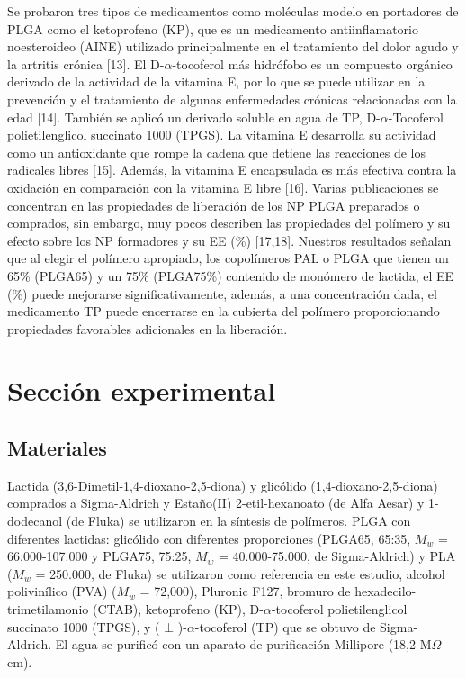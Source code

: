 \documentclass[10pt,letterpaper]{article}
\begin{document}
\begin{multicols}{2}
	Se        probaron   tres tipos de medicamentos como moléculas modelo en portadores de PLGA  como  el ketoprofeno  (KP),  que  es un medicamento  antiinflamatorio  noesteroideo  (AINE)  utilizado principalmente en el  tratamiento  del dolor  agudo  y la artritis crónica  [13]. El  D-$\alpha$-tocoferol  más  hidrófobo  es  un  compuesto  orgánico derivado de la actividad  de la vitamina  E,  por lo que  se puede  utilizar  en la prevención  y el tratamiento  de algunas enfermedades  crónicas relacionadas con la edad  [14]. También   se aplicó un derivado soluble en  agua de  TP, D-$\alpha$-Tocoferol   polietilenglicol succinato 1000   (TPGS).  La vitamina  E  desarrolla  su  actividad como un  antioxidante que rompe la cadena  que  detiene las reacciones de los radicales  libres  [15]. Además, la  vitamina  E  encapsulada es  más  efectiva  contra  la oxidación   en comparación con  la vitamina E libre  [16]. Varias  publicaciones  se concentran  en  las  propiedades de liberación  de los NP PLGA  preparados  o  comprados, sin  embargo,  muy  pocos describen las propiedades   del  polímero  y  su  efecto  sobre  los  NP  formadores  y  su EE (\%) [17,18]. Nuestros  resultados    señalan  que  al  elegir  el  polímero apropiado, los copolímeros PAL  o  PLGA que tienen un 65\% (PLGA65) y un 75\% (PLGA75\%)  contenido de monómero de lactida,   el  EE (\%) puede mejorarse   significativamente,   además, a una concentración   dada,  el medicamento  TP  puede encerrarse    en la cubierta del polímero  proporcionando propiedades  favorables adicionales   en  la liberación.
	
	\section{Sección experimental}
	
	\subsection{Materiales}
	
	Lactida (3,6-Dimetil-1,4-dioxano-2,5-diona) y  glicólido  (1,4-dioxano-2,5-diona)  comprados  a  Sigma-Aldrich y  Estaño(II) 2-etil-hexanoato    (de  Alfa  Aesar) y 1-dodecanol (de Fluka) se utilizaron    en  la síntesis de  polímeros.   PLGA  con  diferentes  lactidas:    glicólido con diferentes proporciones (PLGA65, 65:35,  $M_w$ = 66.000-107.000 y PLGA75, 75:25,  $M_w$ = 40.000-75.000,  de  Sigma-Aldrich) y PLA ($M_w$ = 250.000,  de  Fluka) se utilizaron    como  referencia  en  este  estudio, alcohol polivinílico  (PVA) ($M_w$ = 72,000),  Pluronic F127, bromuro de hexadecilo-trimetilamonio    (CTAB),  ketoprofeno  (KP), D-$\alpha$-tocoferol  polietilenglicol  succinato 1000 (TPGS), y ( ± )-$\alpha$-tocoferol  (TP) que  se  obtuvo  de  Sigma-Aldrich. El agua  se  purificó  con un aparato de purificación  Millipore  (18,2 M$\Omega$cm).  
	

\end{multicols}
\end{document}
